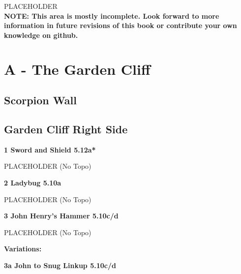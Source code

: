 

\raggedcolumns
\begin{multicols}{2}
PLACEHOLDER\\

\textbf{NOTE: This area is mostly incomplete. Look forward to more information in future revisions of this book or contribute your own knowledge on github.}\\

\newpage
		\section{A - The Garden Cliff}\label{sa:The Garden Cliff}
	
	
			\subsection*{Scorpion Wall}\label{bf:Scorpion Wall}
						
			\subsection*{Garden Cliff Right Side}\label{bf:Garden Cliff Right Side}
						
					\label{rt:Sword and Shield}
\colorbox{Goldenrod!50}{
\parbox{0.95\linewidth}{
\textbf{
1 Sword and Shield 5.12a*  
}
}
}

					\begin{adjustwidth}{0.5cm}{}				
					PLACEHOLDER
						\newline (No Topo) 
					\end{adjustwidth}
					\label{rt:Ladybug}
\colorbox{RoyalBlue!20}{
\parbox{0.95\linewidth}{
\textbf{
2 Ladybug 5.10a  
}
}
}

					\begin{adjustwidth}{0.5cm}{}				
					PLACEHOLDER
						\newline (No Topo) 
					\end{adjustwidth}
					\label{rt:John Henry's Hammer}
\colorbox{RoyalBlue!20}{
\parbox{0.95\linewidth}{
\textbf{
3 John Henry's Hammer 5.10c/d    
}
}
}

					\begin{adjustwidth}{0.5cm}{}				
					PLACEHOLDER
						\newline (No Topo) 
					\end{adjustwidth}
						\begin{adjustwidth}{0.5cm}{}				
						\textbf{Variations:} \newline
							\label{vr:John to Snug Linkup}
\colorbox{RoyalBlue!20}{
\parbox{0.95\linewidth}{
\textbf{
3a John to Snug Linkup 5.10c/d    
}
}
}


\end{adjustwidth}
\end{multicols}
